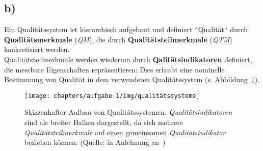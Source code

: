 \subsection*{b)}

Ein Qualitätssystem ist hierarchisch aufgebaut und definiert ``Qualität`` durch \textbf{Qualitätsmerkmale} (\textit{QM}), die durch \textbf{Qualitätsteilmerkmale} (\textit{QTM}) konkretisiert werden.\\
Qualitätsteilmerkmale werden wiederum durch \textbf{Qalitätsindikatoren} definiert, die messbare Eigenschaften repräsentieren: Dies erlaubt eine nominelle Bestimmung von Qualität in dem verwendeten Qualitätssystem (s. Abbildung~\ref{fig:qualitätssysteme}).

\begin{figure}
    \centering
    \texttt{[image: chapters/aufgabe 1/img/qualitätssysteme]}
    \caption{Skizzenhafter Aufbau von Qualitätssystemen. \textit{Qualitätsindikatoren} sind als breiter Balken dargestellt, da sich mehrere \textit{Qualitätsteilmerkmale} auf einen gemeinsamen \textit{Qualitätsindikator} beziehen können. (Quelle: in Anlehnung an~\cite[Abb. 1.1, 3]{Wed09c})}
    \label{fig:qualitätssysteme}
\end{figure}
